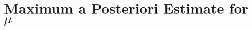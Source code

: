 \newcommand{\mux}{\mu_x}
\newcommand{\mumux}{\mu_{\mu_x}}
\newcommand{\mumuxp}{
  \mu'_{\mu_x}
}
\newcommand{\rhomux}{\rho_{\mu_x}}
\newcommand{\rhox}{\rho_{x}}
\newcommand{\varmux}{\var_{\mu_x}}
\newcommand{\varmuxp}{
  \sigma^{'2}_{\mu_x}
}
\newcommand{\varx}{\var_x}
\newcommand{\pmux}{\pr{\mux}}
\newcommand{\px}{\pr{x}}
\newcommand{\cpmuxx}{\condpr{\mux}{x}}
\newcommand{\cpxmux}{\condpr{x}{\mux}}
\newcommand{\tcpmuxx}{\tcondpr{\mux}{x}}

\newcommand{\sigmax}{\sigma_x}
\newcommand{\sigmamux}{\sigma_{\mu_x}}

\section{Maximum a Posteriori Estimate for $\mu$}






